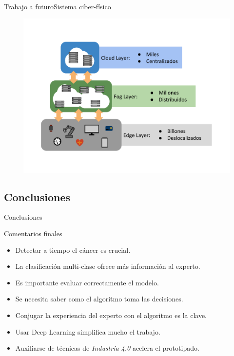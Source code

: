 \documentclass{beamer}
\begin{document}
    \begin{frame}{Trabajo a futuro}{Sistema ciber-físico}
        \begin{figure}[]
            \centering
            \includegraphics[height=0.95\textheight]{cloud}
        \end{figure}
    \end{frame}


    \subsection{Conclusiones}
    \begin{frame}{Conclusiones}{}
        \begin{exampleblock}{Comentarios finales}{
            \begin{itemize}
                \item Detectar a tiempo el cáncer es crucial.
                \item La clasificación multi-clase ofrece más información al experto.
                \item Es importante evaluar correctamente el modelo.
                \item Se necesita saber como el algoritmo toma las decisiones.
                \item Conjugar la experiencia del experto con el algoritmo es la clave.
                \item Usar Deep Learning simplifica mucho el trabajo.
                \item Auxiliarse de técnicas de \emph{Industria 4.0} acelera el prototipado.
            \end{itemize}
        }
            
        \end{exampleblock}
    \end{frame}
\end{document}

